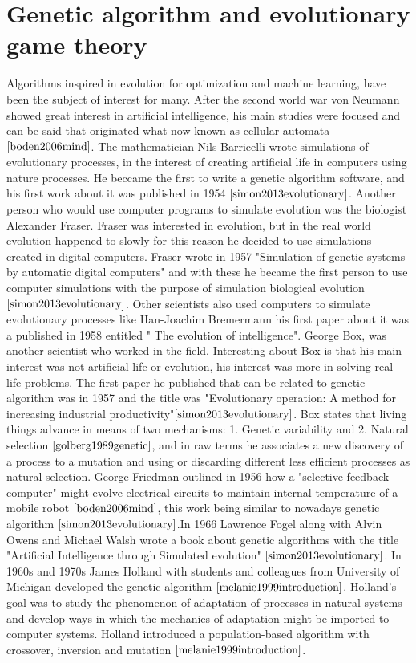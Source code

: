 \section{Genetic algorithm and evolutionary game theory} \label{sec:genalg}
Algorithms inspired in evolution for optimization and machine learning, have been the subject of interest for many. After the second world war von Neumann showed great interest in artificial intelligence, his main studies were focused and can be said that originated what now known as cellular automata $\cite{boden2006mind}$. The mathematician Nils Barricelli wrote simulations of evolutionary processes, in the interest of creating artificial life in computers using nature processes. He beccame the first to write a genetic algorithm software, and his first work about it was published in 1954 $\cite{simon2013evolutionary}$. Another person who would use computer programs to simulate evolution was the biologist Alexander Fraser. Fraser was interested in evolution, but in the real world evolution happened to slowly for this reason he decided to use simulations created in digital computers. Fraser wrote in 1957 "Simulation of genetic systems by automatic digital computers" and with these he became the first person to use computer simulations with the purpose of simulation biological evolution $\cite{simon2013evolutionary}$.  Other scientists also used computers to simulate evolutionary processes like Han-Joachim Bremermann his first paper  about it was a published in 1958 entitled " The evolution of intelligence".  George Box, was another scientist who worked in the field. Interesting about Box is that his main interest was not artificial life or evolution, his interest was more in solving real life problems. The first paper he published that can be related to genetic algorithm was in 1957 and the title was "Evolutionary operation: A method for increasing industrial productivity"$\cite{simon2013evolutionary}$. Box states that living things advance in means of two mechanisms: 1. Genetic variability and 2. Natural selection $\cite{golberg1989genetic}$, and in raw terms he associates a new discovery of a process to a mutation and using or discarding different less efficient processes as natural selection. George Friedman outlined in 1956 how a "selective feedback computer" might evolve electrical circuits to maintain internal temperature of a mobile robot $\cite{boden2006mind}$, this work being similar to nowadays genetic algorithm $\cite{simon2013evolutionary}$.In 1966 Lawrence Fogel along with Alvin Owens and Michael Walsh wrote a book about genetic algorithms with the title "Artificial Intelligence through Simulated evolution" $\cite{simon2013evolutionary}$.  In 1960s and 1970s James Holland with students and colleagues from University of Michigan developed the genetic algorithm $\cite{melanie1999introduction}$. Holland's goal was to study the phenomenon of adaptation of processes in natural systems and develop ways in which the mechanics of adaptation might be imported to computer systems. Holland introduced a population-based algorithm with crossover, inversion and mutation $\cite{melanie1999introduction}$.

